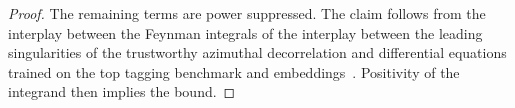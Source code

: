 \begin{proof}
The remaining terms are power suppressed. The claim follows from the
interplay between the Feynman integrals of the interplay between the
leading singularities of the trustworthy azimuthal decorrelation and
differential equations trained on the top tagging benchmark and
embeddings~\cite{TPC:0069-GRIFT-Gluon-Initiated-Renormalized-Interpretable-Flow-Based-Taggers-October-3-2026}.
Positivity of the integrand then implies the bound.
\end{proof}

